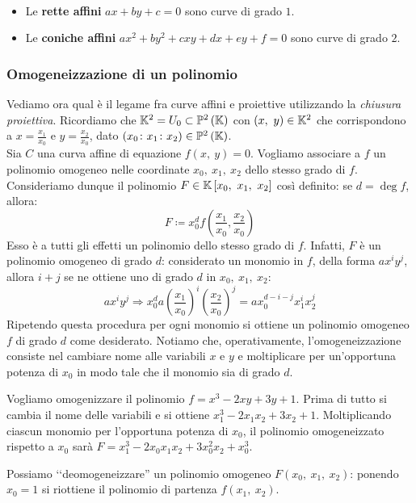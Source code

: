 \begin{define}~{}
	\begin{itemize}
		\item Le \textbf{rette affini} $ax+by+c=0$ sono curve di grado $1$.
		\item Le \textbf{coniche affini} $ax^2+by^2+cxy+dx+ey+f=0$ sono curve di grado $2$.
	\end{itemize}
	\vspace{-3mm}
\end{define}
\subsubsection{Omogeneizzazione di un polinomio}
Vediamo ora qual è il legame fra curve affini e proiettive utilizzando la \textit{chiusura proiettiva}. Ricordiamo che $\kamp^2=U_0\subset \proj[2]{\kamp}$ con $\left(x,\ y\right)\in\mathbb{K}^2$ che corrispondono a $\displaystyle x=\frac{x_1}{x_0}$ e $\displaystyle y=\frac{x_2}{x_0}$, dato $(x_0\colon x_1\colon x_2)\in\proj[2]{\kamp}$.\\
Sia $C$ una curva affine di equazione $f\left(x,\ y\right)=0$. Vogliamo associare a $f$ un polinomio omogeneo nelle coordinate $x_0,\ x_1,\ x_2$ dello stesso grado di $f$.
Consideriamo dunque il polinomio $F\in\mathbb{K}\left[x_0,\ x_1,\ x_2\right]$ così definito: se $d=\deg f$, allora:
\begin{equation}
	F\coloneqq x_0^d f\left( \frac{x_1}{x_0}, \frac{x_2}{x_0} \right)
\end{equation}
Esso è a tutti gli effetti un polinomio dello stesso grado di $f$. Infatti, $F$ è un polinomio omogeneo di grado $d$: considerato un monomio in $f$, della forma $ax^iy^j$, allora $i+j$ se ne ottiene uno di grado $d$ in $x_0,\ x_1,\ x_2$:
	\begin{equation*}
		ax^iy^j \Longrightarrow x_0^d a \left( \frac{x_1}{x_0} \right)^i \left( \frac{x_2}{x_0} \right)^j = ax_0^{d-i-j} x_1^i x_2^j
	\end{equation*}
Ripetendo questa procedura per ogni monomio si ottiene un polinomio omogeneo $f$ di grado $d$ come desiderato. Notiamo che, operativamente, l'omogeneizzazione consiste nel cambiare nome alle variabili $x$ e $y$ e moltiplicare per un'opportuna potenza di $x_0$ in modo tale che il monomio sia di grado $d$.
\begin{example} Vogliamo omogenizzare il polinomio $f=x^3-2xy+3y+1$. Prima di tutto si cambia il nome delle variabili e si ottiene $x_1^3-2x_1x_2+3x_2+1$. Moltiplicando ciascun monomio per l'opportuna potenza di $x_0$, il polinomio omogeneizzato rispetto a $x_0$ sarà $F=x_1^3-2x_0x_1x_2 +3x_0^2x_2+x_0^3$.
\end{example}
\begin{observe}
	Possiamo ‘‘deomogeneizzare'' un polinomio omogeneo $F(x_0,\ x_1,\ x_2)$: ponendo $x_0=1$ si riottiene il polinomio di partenza $f(x_1,\ x_2)$.
\end{observe}
